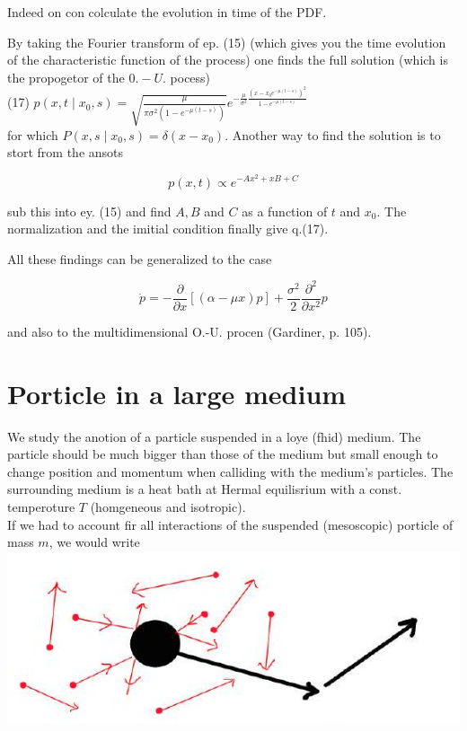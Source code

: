 \documentclass[10pt]{article}
\begin{document}
Indeed on con colculate the evolution in time of the PDF.

By taking the Fourier transform of ep. (15) (which gives you the time evolution of the characteristic function of the process) one finds the full solution (which is the propogetor of the $0 .-U$. pocess)\\
(17) $p\left(x, t \mid x_{0}, s\right)=\sqrt{\frac{\mu}{\pi \sigma^{2}\left(1-e^{-\mu(t-s)}\right)}} e^{-\frac{\mu}{\sigma^{2}} \frac{\left(x-x_{0} e^{-\mu(t-s)}\right)^{2}}{1-e^{-\mu(t-s)}}}$\\
for which $P\left(x, s \mid x_{0}, s\right)=\delta\left(x-x_{0}\right)$. Another way to find the solution is to stort from the ansots

$$
p(x, t) \propto e^{-A x^{2}+x B+C}
$$

sub this into ey. (15) and find $A, B$ and $C$ as a function of $t$ and $x_{0}$. The normalization and the imitial condition finally give q.(17).

All these findings can be generalized to the case

$$
\dot{p}=-\frac{\partial}{\partial x}[(\alpha-\mu x) p]+\frac{\sigma^{2}}{2} \frac{\partial^{2}}{\partial x^{2}} p
$$

and also to the multidimensional O.-U. procen (Gardiner, p. 105).

\section*{Porticle in a large medium}
We study the anotion of a particle suspended in a loye (fhid) medium. The particle should be much bigger than those of the medium but small enough to change position and momentum when calliding with the medium's particles. The surrounding medium is a heat bath at Hermal equilisrium with a const. temperoture $T$ (homgeneous and isotropic).\\
If we had to account fir all interactions of the suspended (mesoscopic) porticle of mass $m$, we would write\\
\includegraphics[max width=\textwidth, center]{2025_10_17_15d569b79a40ed74679eg-10}
\end{document}

